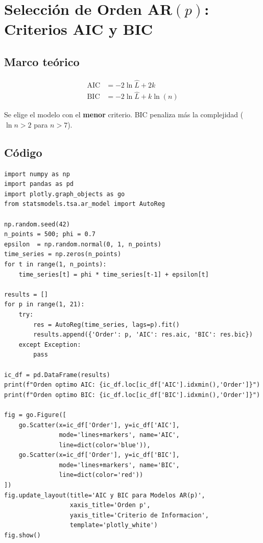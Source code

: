 \documentclass[12pt,letterpaper]{article}
\begin{document}
\section{Selecci\'on de Orden AR$(p)$: Criterios AIC y BIC}

\subsection{Marco te\'orico}

\begin{align}
  \mathrm{AIC} &= -2\ln\hat{L} + 2k \\
  \mathrm{BIC} &= -2\ln\hat{L} + k\ln(n)
\end{align}

Se elige el modelo con el \textbf{menor} criterio. BIC penaliza m\'as la
complejidad ($\ln n > 2$ para $n > 7$).

\subsection{C\'odigo}

\begin{lstlisting}[style=python, caption={Selecci\'on de orden AR por AIC/BIC}]
import numpy as np
import pandas as pd
import plotly.graph_objects as go
from statsmodels.tsa.ar_model import AutoReg

np.random.seed(42)
n_points = 500; phi = 0.7
epsilon  = np.random.normal(0, 1, n_points)
time_series = np.zeros(n_points)
for t in range(1, n_points):
    time_series[t] = phi * time_series[t-1] + epsilon[t]

results = []
for p in range(1, 21):
    try:
        res = AutoReg(time_series, lags=p).fit()
        results.append({'Order': p, 'AIC': res.aic, 'BIC': res.bic})
    except Exception:
        pass

ic_df = pd.DataFrame(results)
print(f"Orden optimo AIC: {ic_df.loc[ic_df['AIC'].idxmin(),'Order']}")
print(f"Orden optimo BIC: {ic_df.loc[ic_df['BIC'].idxmin(),'Order']}")

fig = go.Figure([
    go.Scatter(x=ic_df['Order'], y=ic_df['AIC'],
               mode='lines+markers', name='AIC',
               line=dict(color='blue')),
    go.Scatter(x=ic_df['Order'], y=ic_df['BIC'],
               mode='lines+markers', name='BIC',
               line=dict(color='red'))
])
fig.update_layout(title='AIC y BIC para Modelos AR(p)',
                  xaxis_title='Orden p',
                  yaxis_title='Criterio de Informacion',
                  template='plotly_white')
fig.show()
\end{lstlisting}
\end{document}
